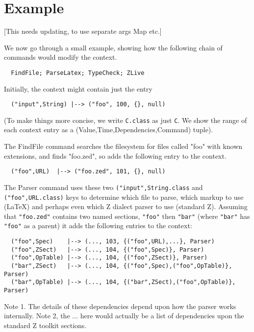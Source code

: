 \documentclass{llncs} %
\begin{document}
\section{Example}

[This needs updating, to use separate args Map etc.]

We now go through a small example, showing how the following
chain of commands would modify the context.
\begin{verbatim}
  FindFile; ParseLatex; TypeCheck; ZLive
\end{verbatim}

Initially, the context might contain just the entry
\begin{small}
\begin{verbatim}
  ("input",String) |--> ("foo", 100, {}, null)
\end{verbatim}
\end{small}
(To make things more concise, we write \texttt{C.class} as just \texttt{C}.
We show the range of each context entry as a (Value,Time,Dependencies,Command)
tuple). 

The FindFile command searches the filesystem for files called
"foo" with known extensions, and finds "foo.zed", so adds the
following entry to the context.
\begin{small}
\begin{verbatim}
  ("foo",URL)  |--> ("foo.zed", 101, {}, null)
\end{verbatim}
\end{small}

The Parser command uses these two \texttt{("input",String.class}
and \texttt{("foo",URL.class)} keys to determine which file
to parse, which markup to use (\LaTeX) and perhaps even which Z dialect
parser to use (standard Z).  Assuming that \texttt{"foo.zed"}
contains two named sections, \texttt{"foo"} then \texttt{"bar"}
(where \texttt{"bar"} has \texttt{"foo"} as a parent)
it adds the following entries to the context:
\begin{small}
\begin{verbatim}
  ("foo",Spec)    |--> (..., 103, {("foo",URL),...}, Parser)
  ("foo",ZSect)   |--> (..., 104, {("foo",Spec)}, Parser)
  ("foo",OpTable) |--> (..., 104, {("foo",ZSect)}, Parser)
  ("bar",ZSect)   |--> (..., 104, {("foo",Spec),("foo",OpTable)}, Parser)
  ("bar",OpTable) |--> (..., 104, {("bar",ZSect),("foo",OpTable)}, Parser)
\end{verbatim}
\end{small}
Note 1. The details of these dependencies depend upon how the
parser works internally.
Note 2, the $\ldots$ here would actually be a list of dependencies
upon the standard Z toolkit sections.
\end{document}
